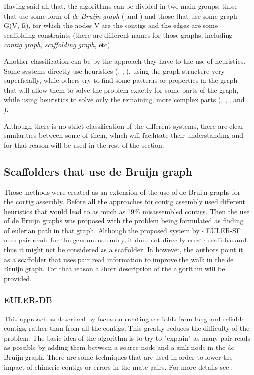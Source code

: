 \documentclass[11pt]{article}
\begin{document}
Having said all that, the algorithms can be divided in two main groups: those
that use some form of \emph{de Bruijn graph} (\cite{pevzner} and
\cite{velvet-scaffolding}) and those that use some graph G(V, E), for which the
nodes V are the contigs and the edges are some scaffolding constraints (there
are different names for those graphs, including \emph{contig graph},
\emph{scaffolding graph}, etc). 

Another classification can be by the approach they have to the use of
heuristics. Some systems directly use heuristics (\cite{greedy-path-merging},
\cite{SOAPdenovo}, \cite{SSPACE}), using the graph structure very superficially,
while others try to find some patterns or properties in the graph that will
allow them to solve the problem exactly for some parts of the graph, while using
heuristics to solve only the remaining, more complex parts (\cite{SOPRA},
\cite{MIR}, \cite{Opera}, \cite{SCARPA} and \cite{grass}).

Although there is no strict classification of the different systems, there are
clear similarities between some of them, which will facilitate their
understanding and for that reason will be used in the rest of the section.

\subsection{Scaffolders that use de Bruijn graph} %
\label{sub:Scaffolders that use de Bruijn graph}
Those methods were created as an extension of the use of de Bruijn graphs for
the contig assembly. Before \cite{pevzner} all the approaches for contig
assembly used different heuristics that would lead to as much as 19\%
misassembled contigs. Then the use of de Bruijn graphs was proposed with
the problem being formulated as finding of eulerian path in that graph. Although
the proposed system by \cite{pevzner} - EULER-SF uses pair reads for the genome
assembly, it does not directly create scaffolds and thus it might not be
considered as a scaffolder. In \cite{SOPRA} however, the authors point it as a
scaffolder that uses pair read information to improve the walk in the de Bruijn
graph. For that reason a short description of the algorithm will be provided.

\subsubsection{EULER-DB} %
\label{ssub:EULER-DB}
This approach as described by \cite{pevzner} focus on creating scaffolds from
long and reliable contigs, rather than from all the contigs. This greatly
reduces the difficulty of the problem. The basic idea of the algorithm is to try
to "explain" as many pair-reads as possible by adding them between a source node
and a sink node in the de Bruijn graph. There are some techniques that are used
in order to lower the impact of chimeric contigs or errors in the mate-pairs.
For more details see \cite{pevzner}.
\end{document}

